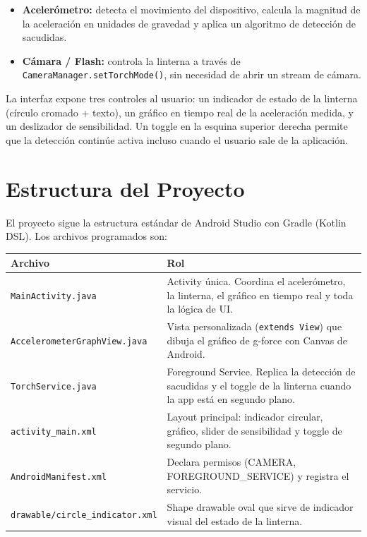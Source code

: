 \documentclass[12pt, a4paper]{article}
\begin{document}
\begin{itemize}
  \item \textbf{Aceler\'ometro:} detecta el movimiento del dispositivo,
        calcula la magnitud de la aceleraci\'on en unidades de gravedad y
        aplica un algoritmo de detecci\'on de sacudidas.
  \item \textbf{C\'amara / Flash:} controla la linterna a trav\'es de
        \texttt{CameraManager.setTorchMode()}, sin necesidad de abrir un
        stream de c\'amara.
\end{itemize}

La interfaz expone tres controles al usuario: un indicador de estado de la
linterna (c\'irculo cromado + texto), un gr\'afico en tiempo real de la
aceleraci\'on medida, y un deslizador de sensibilidad. Un toggle en la esquina
superior derecha permite que la detecci\'on contin\'ue activa incluso cuando el
usuario sale de la aplicaci\'on.

\section{Estructura del Proyecto}

El proyecto sigue la estructura est\'andar de Android Studio con Gradle (Kotlin
DSL). Los archivos programados son:

\vspace{0.5em}
\begin{center}
\begin{tabular}{@{} l p{9.5cm} @{}}
  \toprule
  \textbf{Archivo} & \textbf{Rol} \\
  \midrule
  \texttt{MainActivity.java}
    & Activity \'unica. Coordina el aceler\'ometro, la linterna, el gr\'afico
      en tiempo real y toda la l\'ogica de UI. \\[0.4em]
  \texttt{AccelerometerGraphView.java}
    & Vista personalizada (\texttt{extends View}) que dibuja el gr\'afico de
      g-force con Canvas de Android. \\[0.4em]
  \texttt{TorchService.java}
    & Foreground Service. Replica la detecci\'on de sacudidas y el toggle de
      la linterna cuando la app est\'a en segundo plano. \\[0.4em]
  \texttt{activity\_main.xml}
    & Layout principal: indicador circular, gr\'afico, slider de sensibilidad
      y toggle de segundo plano. \\[0.4em]
  \texttt{AndroidManifest.xml}
    & Declara permisos (CAMERA, FOREGROUND\_SERVICE) y registra el servicio. \\[0.4em]
  \texttt{drawable/circle\_indicator.xml}
    & Shape drawable oval que sirve de indicador visual del estado de la
      linterna. \\
  \bottomrule
\end{tabular}
\end{center}
\end{document}
